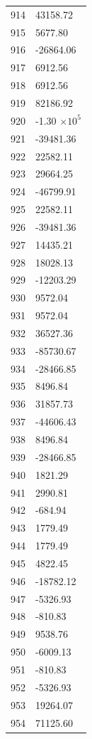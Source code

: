 \documentclass[a4paper,11pt]{article}
\begin{document}
\begin{center}
\begin{longtable}{|R{1.5cm}|R{2.6cm}|}
  914 &     43158.72 \\
  915 &      5677.80 \\
  916 &    -26864.06 \\
  917 &      6912.56 \\
  918 &      6912.56 \\
  919 &     82186.92 \\
  920 &        -1.30 $\times 10^{           5}$ \\
  921 &    -39481.36 \\
  922 &     22582.11 \\
  923 &     29664.25 \\
  924 &    -46799.91 \\
  925 &     22582.11 \\
  926 &    -39481.36 \\
  927 &     14435.21 \\
  928 &     18028.13 \\
  929 &    -12203.29 \\
  930 &      9572.04 \\
  931 &      9572.04 \\
  932 &     36527.36 \\
  933 &    -85730.67 \\
  934 &    -28466.85 \\
  935 &      8496.84 \\
  936 &     31857.73 \\
  937 &    -44606.43 \\
  938 &      8496.84 \\
  939 &    -28466.85 \\
  940 &      1821.29 \\
  941 &      2990.81 \\
  942 &      -684.94 \\
  943 &      1779.49 \\
  944 &      1779.49 \\
  945 &      4822.45 \\
  946 &    -18782.12 \\
  947 &     -5326.93 \\
  948 &      -810.83 \\
  949 &      9538.76 \\
  950 &     -6009.13 \\
  951 &      -810.83 \\
  952 &     -5326.93 \\
  953 &     19264.07 \\
  954 &     71125.60 \\

\end{longtable}
\end{center}
\end{document}
